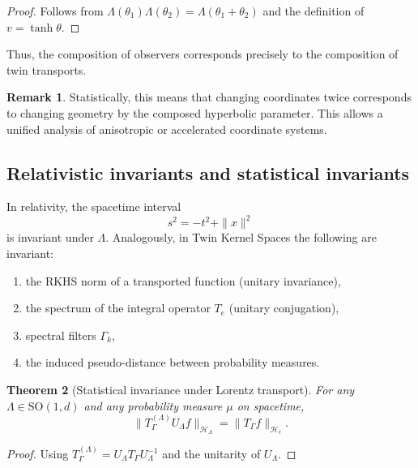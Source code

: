 \documentclass[11pt]{article}
\newtheorem{theorem}{Theorem}[section]
\theoremstyle{definition}
\newtheorem{remark}[theorem]{Remark}
\begin{document}
	\begin{proof}
		Follows from $\Lambda(\theta_1)\Lambda(\theta_2)=\Lambda(\theta_1+\theta_2)$ and the definition of $v=\tanh\theta$.
	\end{proof}
	
	Thus, the composition of observers corresponds precisely to the composition of twin transports.
	
	\begin{remark}
		Statistically, this means that changing coordinates twice corresponds to changing geometry by the composed hyperbolic parameter.
		This allows a unified analysis of anisotropic or accelerated coordinate systems.
	\end{remark}
	
	\subsection{Relativistic invariants and statistical invariants}
	
	In relativity, the spacetime interval
	\[
	s^2 = -t^2 + \|x\|^2
	\]
	is invariant under $\Lambda$.
	Analogously, in Twin Kernel Spaces the following are invariant:
	
	\begin{enumerate}[itemsep=3pt]
		\item the RKHS norm of a transported function (unitary invariance),
		\item the spectrum of the integral operator $T_e$ (unitary conjugation),
		\item spectral filters $\Gamma_k$,
		\item the induced pseudo-distance between probability measures.
	\end{enumerate}
	
	\begin{theorem}[Statistical invariance under Lorentz transport]
		For any $\Lambda\in \mathrm{SO}(1,d)$ and any probability measure $\mu$ on spacetime,
		\[
		\| T_\Gamma^{(\Lambda)} U_\Lambda f \|_{\mathcal{H}_\Lambda}
		= \| T_\Gamma f \|_{\mathcal{H}_e}.
		\]
	\end{theorem}
	
	\begin{proof}
		Using $T_\Gamma^{(\Lambda)}=U_\Lambda T_\Gamma U_\Lambda^{-1}$ and the unitarity of $U_\Lambda$.
	\end{proof}
	
\end{document}
